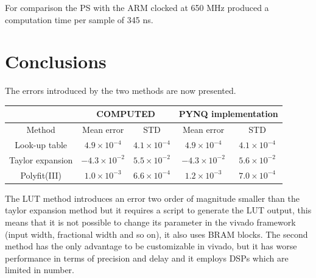 \documentclass[12pt]{article}
\begin{document}
For comparison the PS with the ARM clocked at 650 MHz produced a computation time per sample of 345 ns.

\section{Conclusions}

The errors introduced by the two methods are now presented.
\begin{table}[h]
\begin{tabular}{c||cc|cc}
&\multicolumn{2}{c|}{COMPUTED}&\multicolumn{2}{c}{PYNQ implementation} \\ \hline 
Method           & Mean error  & STD & Mean error  & STD  \\ \hline
Look-up table    & $4.9\times 10^{-4}$ & $4.1\times 10^{-4}$  & $4.9\times 10^{-4}$ & $4.1\times 10^{-4}$ \\

Taylor expansion & $-4.3\times 10^{-2}$ & $5.5\times 10^{-2}$ & $-4.3\times 10^{-2}$ & $5.6\times 10^{-2}$ \\

Polyfit(III) & $1.0\times 10^{-3}$ & $6.6\times 10^{-4}$ & $1.2\times 10^{-3}$ & $7.0\times 10^{-4}$ \\
\end{tabular}
\end{table}
The LUT method introduces an error two order of magnitude smaller than the taylor expansion method but it requires a script to generate the LUT output, this means that it is not possible to change its parameter in the vivado framework (input width, fractional width and so on), it also uses BRAM blocks.  
The second method has the only advantage to be customizable in vivado, but it has worse performance in terms of precision and delay and it employs DSPs which are limited in number.
\end{document}
